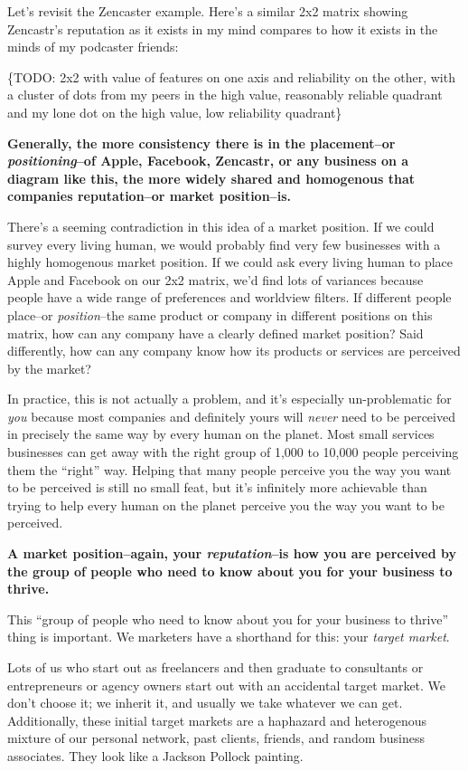 Let's revisit the Zencaster example. Here's a similar 2x2 matrix showing Zencastr's reputation as it exists in my mind compares to how it exists in the minds of my podcaster friends:

\{TODO: 2x2 with value of features on one axis and reliability on the other, with a cluster of dots from my peers in the high value, reasonably reliable quadrant and my lone dot on the high value, low reliability quadrant\}

\textbf{Generally, the more consistency there is in the placement--or \emph{positioning}--of Apple, Facebook, Zencastr, or any business on a diagram like this, the more widely shared and homogenous that companies reputation--or market position--is.}

There's a seeming contradiction in this idea of a market position. If we could survey every living human, we would probably find very few businesses with a highly homogenous market position. If we could ask every living human to place Apple and Facebook on our 2x2 matrix, we'd find lots of variances because people have a wide range of preferences and worldview filters. If different people place--or \emph{position}--the same product or company in different positions on this matrix, how can any company have a clearly defined market position? Said differently, how can any company know how its products or services are perceived by the market?

In practice, this is not actually a problem, and it's especially un-problematic for \emph{you} because most companies and definitely yours will \emph{never} need to be perceived in precisely the same way by every human on the planet. Most small services businesses can get away with the right group of 1,000 to 10,000 people perceiving them the ``right'' way. Helping that many people perceive you the way you want to be perceived is still no small feat, but it's infinitely more achievable than trying to help every human on the planet perceive you the way you want to be perceived.

\textbf{A market position--again, your \emph{reputation}--is how you are perceived by the group of people who need to know about you for your business to thrive.}

This ``group of people who need to know about you for your business to thrive'' thing is important. We marketers have a shorthand for this: your \emph{target market}.

Lots of us who start out as freelancers and then graduate to consultants or entrepreneurs or agency owners start out with an accidental target market. We don't choose it; we inherit it, and usually we take whatever we can get. Additionally, these initial target markets are a haphazard and heterogenous mixture of our personal network, past clients, friends, and random business associates. They look like a Jackson Pollock painting.

